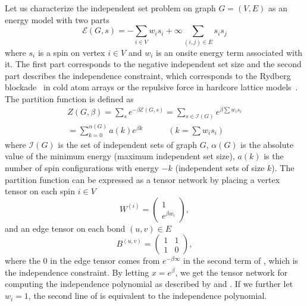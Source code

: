 \documentclass[review, onefignum, onetabnum]{siamart190516}
\begin{document}
Let us characterize the independent set problem on graph $G=(V, E)$ as an energy model with two parts
\begin{equation}\label{eq:eng}
    \mathcal{E}(G, s) = -\sum_{i\in V} w_i s_i + \infty \sum_{(i,j) \in E}s_i s_j
\end{equation}
where $s_i$ is a spin on vertex $i \in V$ and $w_i$ is an onsite energy term associated with it.
The first part corresponds to the negative independent set size and the second part describes the independence constraint, which corresponds to the Rydberg blockade~\cite{Pichler2018, Ebadi2022} in cold atom arrays or the repulsive force in hardcore lattice models~\cite{Dyre2016, Fernandes2007}.
The partition function is defined as
\begin{equation}\label{eq:partition}
    \begin{split}
    Z(G, \beta) = \sum_{s}e^{-\beta \mathcal{E}(G, s)} = \sum_{s\in \mathcal{I}(G)} e^{\beta \sum w_i s_i}\\
         = \sum_{k=0}^{\alpha(G)}a(k) e^{\beta k}  \qquad \quad (k = \sum w_i s_i)
    \end{split}
\end{equation}
where $\mathcal{I}(G)$ is the set of independent sets of graph $G$, $\alpha(G)$ is the absolute value of the minimum energy (maximum independent set size), $a(k)$ is the number of spin configurations with energy $-k$ (independent sets of size $k$).
The partition function can be expressed as a tensor network by placing a vertex tensor on each spin $i \in V$
\begin{equation}
    W^{(i)} = \left(\begin{matrix}
        1 \\
        e^{\beta w_i}
    \end{matrix}\right),
\end{equation}
and an edge tensor on each bond $(u, v) \in E$
\begin{equation}
       B^{(u, v)} = \left(\begin{matrix}
        1  & 1\\
        1 & 0
    \end{matrix}\right),
\end{equation}
where the $0$ in the edge tensor comes from $e^{-\beta\infty}$ in the second term of , which is the independence constraint.
By letting $x = e^{\beta}$, we get the tensor network for computing the independence polynomial as described by  and .
If we further let $w_i=1$, the second line of  is equivalent to the independence polynomial.
\end{document}
